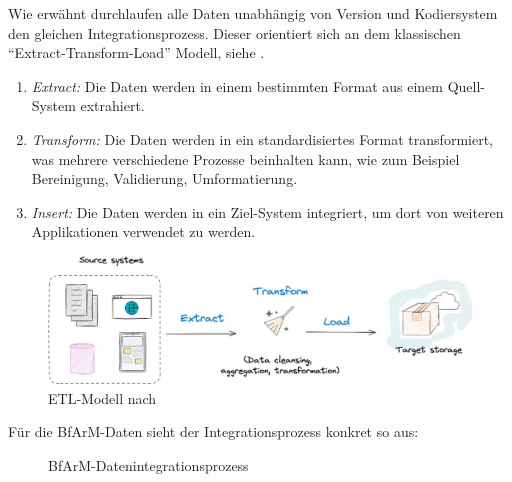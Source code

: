 Wie erwähnt durchlaufen alle Daten unabhängig von Version und Kodiersystem den gleichen Integrationsprozess. Dieser orientiert sich an dem klassischen ``Extract-Transform-Load'' Modell, siehe \citep[Seite 247ff]{bonnefoy2024definitive}.

\begin{enumerate}
\item \emph{Extract:} Die Daten werden in einem bestimmten Format aus einem Quell-System extrahiert. 
\item \emph{Transform:} Die Daten werden in ein standardisiertes Format transformiert, was mehrere verschiedene Prozesse beinhalten kann, wie zum Beispiel Bereinigung, Validierung, Umformatierung.
\item \emph{Insert:} Die Daten werden in ein Ziel-System integriert, um dort von weiteren Applikationen verwendet zu werden. 
\end{enumerate}

\vspace{10pt}

\begin{figure}[H]
    \centering
    \includegraphics[width=\linewidth]{../img/etl.jpg}
    \caption{ETL-Modell nach \citep[Seite 63]{bonnefoy2024definitive}}
\end{figure}

Für die BfArM-Daten sieht der Integrationsprozess konkret so aus:

\begin{figure}[H]
    \centering
    \resizebox{.9\textwidth}{!}{}
    \caption{BfArM-Datenintegrationsprozess}
\end{figure}

